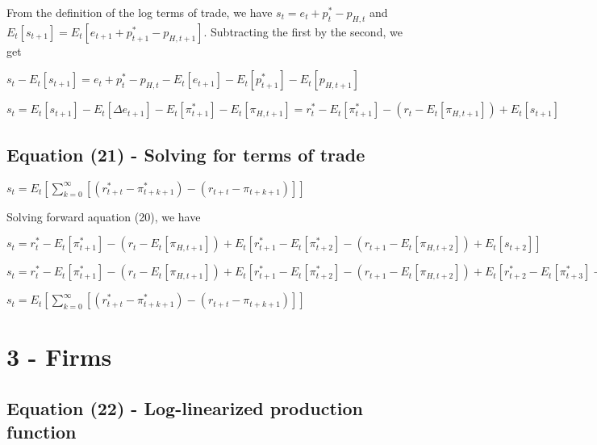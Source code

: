\documentclass[
]{article}
\begin{document}
From the definition of the log terms of trade, we have
\(s_t = e_t + p_t^* - p_{H,t}\) and
\(E_t[s_{t+1}] = E_t[e_{t+1} + p_{t+1}^* - p_{H,t+1}]\). Subtracting the
first by the second, we get

\(s_t - E_t[s_{t+1}] = e_t + p_t^* - p_{H,t} - E_t[e_{t+1}] - E_t[p_{t+1}^*] - E_t[p_{H,t+1}]\)

\(s_t = E_t[s_{t+1}]-E_t[\Delta e_{t+1}] -E_t[\pi_{t+1}^*]-E_t[\pi_{H,t+1}]=r_t^*-E_t[\pi_{t+1}^*] - (r_t-E_t[\pi_{H,t+1}])+E_t[s_{t+1}]\)

\vspace{12pt}

\hypertarget{equation-21---solving-for-terms-of-trade}{%
\subsection{Equation (21) - Solving for terms of
trade}\label{equation-21---solving-for-terms-of-trade}}

\(\displaystyle s_t = E_t \left[ \sum_{k=0}^\infty [\left( r_{t+t}^*-\pi_{t+k+1}^*\right)-\left( r_{t+t}-\pi_{t+k+1}\right)] \right]\)

\vspace{8pt}

Solving forward aquation (20), we have

\(s_t =r_t^*-E_t[\pi_{t+1}^*] - (r_t-E_t[\pi_{H,t+1}])+E_t[r_{t+1}^*-E_t[\pi_{t+2}^*] - (r_{t+1}-E_t[\pi_{H,t+2}])+E_t[s_{t+2}]]\)

\(s_t =r_t^*-E_t[\pi_{t+1}^*] - (r_t-E_t[\pi_{H,t+1}])+E_t[r_{t+1}^*-E_t[\pi_{t+2}^*] - (r_{t+1}-E_t[\pi_{H,t+2}])+E_t[{r_{t+2}^*-E_t[\pi_{t+3}^*] - (r_{t+2}-E_t[\pi_{H,t+3}])+E_t[s_{t+3}]}]]\)

\(\displaystyle s_t = E_t \left[ \sum_{k=0}^\infty [\left( r_{t+t}^*-\pi_{t+k+1}^*\right)-\left( r_{t+t}-\pi_{t+k+1}\right)] \right]\)

\vspace{12pt}

\hypertarget{firms}{%
\section{3 - Firms}\label{firms}}

\vspace{12pt}

\hypertarget{equation-22---log-linearized-production-function}{%
\subsection{Equation (22) - Log-linearized production
function}\label{equation-22---log-linearized-production-function}}
\end{document}
